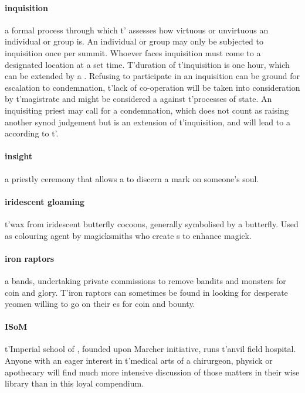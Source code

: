 \paragraph{inquisition} a formal process through which t'\allowbreak {} assesses how virtuous or unvirtuous an individual or group is. An individual or group may only be subjected to inquisition once per summit. Whoever faces inquisition must come to a designated location at a set time. T'duration of t'\allowbreak inquisition is one hour, which can be extended by a . Refusing to participate in an inquisition can be ground for escalation to condemnation, t'\allowbreak lack of co-operation will be taken into consideration by t'\allowbreak magistrate and might be considered a  against t'\allowbreak processes of state. An inquisiting priest may call for a condemnation, which does not count as raising another synod judgement but is an extension of t'\allowbreak inquisition, and will lead to a  according to t'\allowbreak {}.
\paragraph{insight} a priestly ceremony that allows a  to discern a mark on someone's soul.
\paragraph{iridescent gloaming} t'\allowbreak wax from iridescent butterfly cocoons, generally symbolised by a butterfly. Used as colouring agent by magicksmiths who create s to enhance magick.
\paragraph{iron raptors} a  bands, undertaking private commissions to remove bandits and monsters for coin and glory. T'iron raptors can sometimes be found in  looking for desperate yeomen willing to go on their es for coin and bounty.
\paragraph{ISoM} t'\allowbreak Imperial school of , founded upon Marcher initiative, runs t'\allowbreak anvil field hospital. Anyone with an eager interest in t'\allowbreak medical arts of a chirurgeon, physick or apothecary will find much more intensive discussion of those matters in their wise library than in this loyal compendium.
